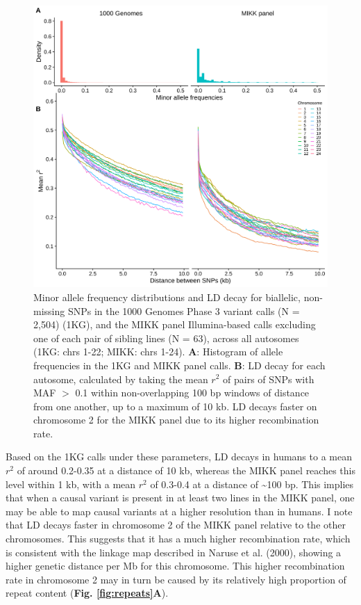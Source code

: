 \documentclass[
]{book}
\begin{document}
\begin{figure}
\includegraphics[width=1\linewidth]{figs/mikk_genome/08_ld_decay} \caption{Minor allele frequency distributions and LD decay for biallelic, non-missing SNPs in the 1000 Genomes Phase 3 variant calls (N = 2,504) (1KG), and the MIKK panel Illumina-based calls excluding one of each pair of sibling lines (N = 63), across all autosomes (1KG: chrs 1-22; MIKK: chrs 1-24). \textbf{A}: Histogram of allele frequencies in the 1KG and MIKK panel calls. \textbf{B}: LD decay for each autosome, calculated by taking the mean \(r^2\) of pairs of SNPs with MAF \(>\) 0.1 within non-overlapping 100 bp windows of distance from one another, up to a maximum of 10 kb. LD decays faster on chromosome 2 for the MIKK panel due to its higher recombination rate.}\label{fig:LDdecay}
\end{figure}

Based on the 1KG calls under these parameters, LD decays in humans to a mean \(r^2\) of around 0.2-0.35 at a distance of 10 kb, whereas the MIKK panel reaches this level within 1 kb, with a mean \(r^2\) of 0.3-0.4 at a distance of \textasciitilde100 bp. This implies that when a causal variant is present in at least two lines in the MIKK panel, one may be able to map causal variants at a higher resolution than in humans. I note that LD decays faster in chromosome 2 of the MIKK panel relative to the other chromosomes. This suggests that it has a much higher recombination rate, which is consistent with the linkage map described in Naruse et al. (2000), showing a higher genetic distance per Mb for this chromosome. This higher recombination rate in chromosome 2 may in turn be caused by its relatively high proportion of repeat content (\textbf{Fig. \ref{fig:repeats}A}).
\end{document}
